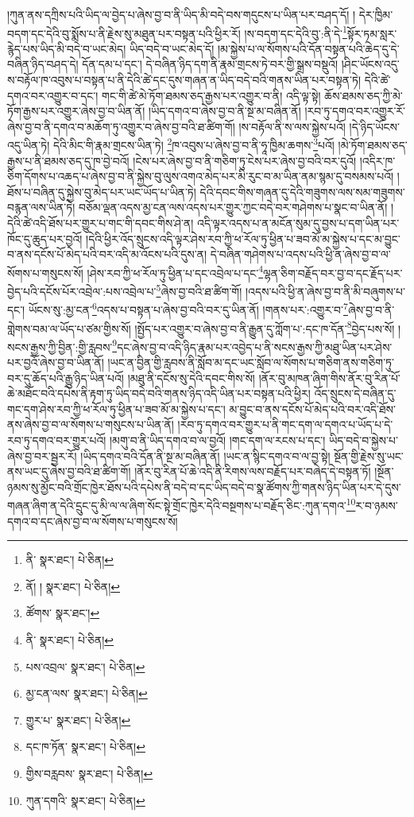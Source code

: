 །ཀུན་ནས་དཀྲིས་པའི་ཡིད་ལ་བྱེད་པ་ཞེས་བྱ་བ་ནི་ཡིད་མི་བདེ་བས་གདུངས་པ་ཡིན་པར་བཤད་དོ། །
དེར་ཁྱིམ་བདག་དང་དེའི་བུ་སྨོས་པ་ནི་རྗེས་སུ་མཐུན་པར་བསྟན་པའི་ཕྱིར་རོ། །ས་བདག་དང་དེའི་བུ་:ནི་དེ་\footnote{ནི་  སྣར་ཐང་།  པེ་ཅིན། }སྟོར་ཏམ་སླར་རྙེད་པས་ཡིད་མི་བདེ་བ་ཡང་མེད། ཡིད་བདེ་བ་ཡང་མེད་དོ། །མ་སྐྱེས་པ་ལ་སོགས་པའི་དོན་བསྟན་པའི་ཆེད་དུ་དེ་བཞིན་ཉིད་བཤད་དེ། དོན་དམ་པ་དང་། དེ་བཞིན་ཉིད་དག་ནི་རྣམ་གྲངས་ཏེ་བར་གྱི་སྒྲས་བསྡུའོ། །ཤིང་ཡོངས་འདུ་ས་བརྟོལ་ཁ་འབུས་པ་བསྟན་པ་ནི་དེའི་ཚེ་དང་དུས་གཞན་ན་ཡིད་བདེ་བའི་གནས་ཡིན་པར་བསྟན་ཏེ། དེའི་ཚེ་དགའ་བར་འགྱུར་བ་དང་། གང་གི་ཚེ་མེ་ཏོག་ཐམས་ཅད་རྒྱས་པར་འགྱུར་བ་ནི། འདི་ལྟ་སྟེ། ཆོས་ཐམས་ཅད་ཀྱི་མེ་ཏོག་རྒྱས་པར་འགྱུར་ཞེས་བྱ་བ་ཡིན་ནོ། །ཡིད་དགའ་བ་ཞེས་བྱ་བ་ནི་སྔ་མ་བཞིན་ནོ། །རབ་ཏུ་དགའ་བར་འགྱུར་རོ་ཞེས་བྱ་བ་ནི་དགའ་བ་མཆོག་ཏུ་འགྱུར་བ་ཞེས་བྱ་བའི་ཐ་ཚིག་གོ། །ས་བརྟོལ་ནི་ས་ལས་སྐྱེས་པའོ། །དེ་ཉིད་ཡོངས་འདུ་ཡིན་ཏེ། དེའི་མིང་གི་རྣམ་གྲངས་ཡིན་ཏེ། \footnote{ནོ། །   སྣར་ཐང་།  པེ་ཅིན། }ཁ་འབུས་པ་ཞེས་བྱ་བ་ནི་ཧཱ་ཁྱིམ་ཆགས་\footnote{ཚོགས་  སྣར་ཐང་། }པའོ། །མེ་ཏོག་ཐམས་ཅད་རྒྱས་པ་ནི་ཐམས་ཅད་དུ་ཁ་བྱེ་བའོ། །ངེས་པར་ཞེས་བྱ་བ་ནི་གཅིག་ཏུ་ངེས་པར་ཞེས་བྱ་བའི་བར་དུའོ། །འདིར་ཁ་ཅིག་དོགས་པ་འཆད་པ་ཞེས་བྱ་བ་ནི་སྐྱེས་བུ་ལུས་འགའ་མེད་པར་མི་རུང་བ་མ་ཡིན་ནམ་སྙམ་དུ་བསམས་པའོ། །ཐོས་པ་བཞིན་དུ་སྐྱེས་བུ་མེད་པར་ཡང་ཡོད་པ་ཡིན་ཏེ། དེའི་དབང་གིས་གཞན་དུ་དེའི་གཟུགས་ལས་སམ་གཟུགས་བརྙན་ལས་ཡིན་ཏེ། བཅོམ་ལྡན་འདས་མྱ་ངན་ལས་འདས་པར་གྱུར་ཀྱང་བདེ་བར་གཤེགས་པ་སྣང་བ་ཡིན་ནོ། །དེའི་ཚེ་འདི་ཐོས་པར་གྱུར་པ་གང་གི་དབང་གིས་ཤེ་ན། འདི་ལྟར་འདས་པ་ན་མངོན་སུམ་དུ་བྱས་པ་དག་ཡིན་པར་ཁོང་དུ་ཆུད་པར་བྱའོ། །དེའི་ཕྱིར་འོད་སྲུངས་འདི་ལྟར་ཤེས་རབ་ཀྱི་ཕ་རོལ་ཏུ་ཕྱིན་པ་ཟབ་མོ་མ་སྐྱེས་པ་དང་མ་བྱུང་བ་ནས་དངོས་པོ་མེད་པའི་བར་འདི་མ་འོངས་པའི་དུས་ན། དེ་བཞིན་གཤེགས་པ་འདས་པའི་ཕྱི་ན་ཞེས་བྱ་བ་ལ་སོགས་པ་གསུངས་སོ། །ཤེས་རབ་ཀྱི་ཕ་རོལ་ཏུ་ཕྱིན་པ་དང་འབྲེལ་པ་དང་\footnote{ནི་  སྣར་ཐང་།  པེ་ཅིན། }ལྷན་ཅིག་བརྗོད་བར་བྱ་བ་དང་རྗོད་པར་བྱེད་པའི་དངོས་པོར་འབྲེལ་:པས་འབྲེལ་པ་\footnote{པས་འབྲལ་  སྣར་ཐང་།  པེ་ཅིན། }ཞེས་བྱ་བའི་ཐ་ཚིག་གོ། །འདས་པའི་ཕྱི་ན་ཞེས་བྱ་བ་ནི་མི་བཞུགས་པ་དང་། ཡོངས་སུ་:མྱ་ངན་\footnote{མྱ་ངན་ལས་  སྣར་ཐང་།  པེ་ཅིན། }འདས་པ་བསྟན་པ་ཞེས་བྱ་བའི་བར་དུ་ཡིན་ནོ། །གནས་པར་:འགྱུར་བ་\footnote{གྱུར་པ་  སྣར་ཐང་།  པེ་ཅིན། }ཞེས་བྱ་བ་ནི་གླེགས་བམ་ལ་ཡོད་པ་ཙམ་གྱིས་སོ། །སྤྱོད་པར་འགྱུར་བ་ཞེས་བྱ་བ་ནི་རྒྱུན་དུ་ཀློག་པ་:དང་ཁ་དོན་\footnote{དང་ཁ་ཏོན་  སྣར་ཐང་།  པེ་ཅིན། }བྱེད་པས་སོ། །སངས་རྒྱས་ཀྱི་བྱིན་:གྱི་རླབས་\footnote{གྱིས་བརླབས་  སྣར་ཐང་།  པེ་ཅིན། }དང་ཞེས་བྱ་བ་འདི་ཉིད་རྣམ་པར་འབྱེད་པ་ནི་སངས་རྒྱས་ཀྱི་མཐུ་ཡིན་པར་ཤེས་པར་བྱའོ་ཞེས་བྱ་བ་ཡིན་ནོ། །ཡང་ན་བྱིན་གྱི་རླབས་ནི་སློབ་མ་དང་ཡང་སློབ་ལ་སོགས་པ་གཅིག་ནས་གཅིག་ཏུ་བར་དུ་ཆོད་པའི་རྒྱུ་ཉིད་ཡིན་པའོ། །མཐུ་ནི་དངོས་སུ་དེའི་དབང་གིས་སོ། །ནོར་བུ་མཁན་ཞིག་གིས་ནོར་བུ་རིན་པོ་ཆེ་མཐོང་བའི་དཔེས་ནི་རྟག་ཏུ་ཡིད་བདེ་བའི་གནས་ཉིད་འདི་ཡིན་པར་བསྟན་པའི་ཕྱིར། འོད་སྲུངས་དེ་བཞིན་དུ་གང་དག་ཤེས་རབ་ཀྱི་ཕ་རོལ་ཏུ་ཕྱིན་པ་ཟབ་མོ་མ་སྐྱེས་པ་དང་། མ་བྱུང་བ་ནས་དངོས་པོ་མེད་པའི་བར་འདི་ཐོས་ནས་ཞེས་བྱ་བ་ལ་སོགས་པ་གསུངས་པ་ཡིན་ནོ། །རབ་ཏུ་དགའ་བར་གྱུར་པ་ནི་གང་དག་ལ་དགའ་པ་ཡོད་པ་དེ་རབ་ཏུ་དགའ་བར་གྱུར་པའོ། །མགུ་བ་ནི་ཡིད་དགའ་བ་ལ་བྱའོ། །གང་དག་ལ་རངས་པ་དང་། ཡིད་བདེ་བ་སྐྱེས་པ་ཞེས་བྱ་བར་སྦྱར་རོ། །ཡིད་དགའ་བའི་དོན་ནི་སྔ་མ་བཞིན་ནོ། །ཡང་ན་སྙིང་དགའ་བ་ལ་བྱ་སྟེ། སྔོན་གྱི་རྗེས་སུ་ཡང་ནས་ཡང་དུ་ཞེས་བྱ་བའི་ཐ་ཚིག་གོ། །ནོར་བུ་རིན་པོ་ཆེ་འདི་ནི་རིགས་ལས་བརྗོད་པར་བཞེད་དེ་བསྟན་ཏོ། །སྔོན་ཉམས་སུ་མྱོང་བའི་གྲོང་ཁྱེར་ཐོས་པའི་དཔེས་ནི་བདེ་བ་དང་ཡིད་བདེ་བ་སྣ་ཚོགས་ཀྱི་གནས་ཉིད་ཡིན་པར་དེ་དུས་གཞན་ཞིག་ན་དེའི་དྲུང་དུ་མི་ལ་ལ་ཞིག་སོང་སྟེ་གྲོང་ཁྱེར་དེའི་བསྔགས་པ་བརྗོད་ཅིང་:ཀུན་དགའ་\footnote{ཀུན་དགའི་  སྣར་ཐང་།  པེ་ཅིན། }ར་བ་ཉམས་དགའ་བ་དང་ཞེས་བྱ་བ་ལ་སོགས་པ་གསུངས་སོ། 